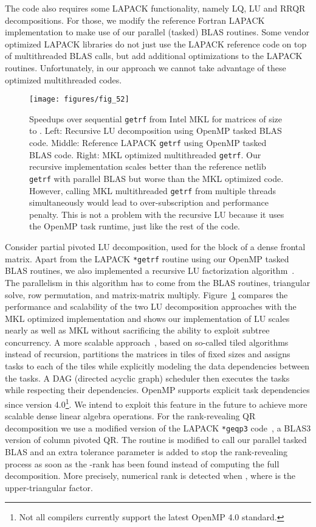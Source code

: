 \documentclass{article}
\newcommand{\tm}{\textsuperscript{\textregistered}}
\begin{document}
The code also requires some LAPACK functionality, namely LQ, LU and
RRQR decompositions. For those, we modify the reference Fortran LAPACK
implementation to make use of our parallel (tasked) BLAS
routines. Some vendor optimized LAPACK libraries do not just use the
LAPACK reference code on top of multithreaded BLAS calls, but add
additional optimizations to the LAPACK routines. Unfortunately, in our
approach we cannot take advantage of these optimized multithreaded
codes.
\begin{figure}
  \begin{center}
    \texttt{[image: figures/fig\_52]}
  \end{center}
  \caption{\footnotesize Speedups over sequential \texttt{getrf} from
    Intel\tm{} MKL for matrices of size  to . Left:
    Recursive LU decomposition using OpenMP tasked BLAS code. Middle:
    Reference LAPACK \texttt{getrf} using OpenMP tasked BLAS
    code. Right: MKL optimized multithreaded \texttt{getrf}. Our
    recursive implementation scales better than the reference netlib
    \texttt{getrf} with parallel BLAS but worse than the MKL optimized
    code. However, calling MKL multithreaded \texttt{getrf} from
    multiple threads simultaneously would lead to over-subscription
    and performance penalty. This is not a problem with the recursive
    LU because it uses the OpenMP task runtime, just like the rest of
    the code.}
  \label{fig:scaling_LU}
\end{figure}
Consider partial pivoted LU decomposition, used for the  block
of a dense frontal matrix. Apart from the LAPACK \verb+*getrf+ routine
using our OpenMP tasked BLAS routines, we also implemented a recursive
LU factorization
algorithm~\cite{recursiveTileLU}. The parallelism in this algorithm has to come from the BLAS routines,
triangular solve, row permutation, and matrix-matrix
multiply. Figure~\ref{fig:scaling_LU} compares the performance and
scalability of the two LU decomposition approaches with the MKL
optimized implementation and shows our implementation of LU scales
nearly as well as MKL without sacrificing the ability to exploit
subtree concurrency. A more scalable approach~\cite{buttari2009class},
based on so-called tiled algorithms instead of recursion, partitions
the matrices in tiles of fixed sizes and assigns tasks to each of the
tiles while explicitly modeling the data dependencies between the
tasks. A DAG (directed acyclic graph) scheduler then executes the
tasks while respecting their dependencies. OpenMP supports explicit
task dependencies since version 4.0\footnote{Not all compilers
  currently support the latest OpenMP 4.0 standard.}. We intend to
exploit this feature in the future to achieve more scalable dense
linear algebra operations.
For the rank-revealing QR decomposition we use a modified version of
the LAPACK \verb+*geqp3+ code~\cite{quintana1998blas}, a BLAS3 version
of column pivoted QR. The routine is modified to call our parallel
tasked BLAS and an extra tolerance parameter  is added to
stop the rank-revealing process as soon as the -rank has
been found instead of computing the full decomposition. More
precisely, numerical rank  is detected when , where  is the upper-triangular factor.
\end{document}
